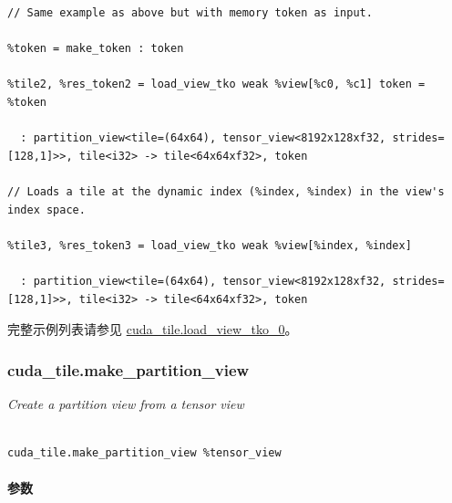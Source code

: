 \documentclass{article}
\begin{document}
\begin{itemize}
\begin{lstlisting}
// Same example as above but with memory token as input.

%token = make_token : token

%tile2, %res_token2 = load_view_tko weak %view[%c0, %c1] token = %token

  : partition_view<tile=(64x64), tensor_view<8192x128xf32, strides=[128,1]>>, tile<i32> -> tile<64x64xf32>, token

// Loads a tile at the dynamic index (%index, %index) in the view's index space.

%tile3, %res_token3 = load_view_tko weak %view[%index, %index]

  : partition_view<tile=(64x64), tensor_view<8192x128xf32, strides=[128,1]>>, tile<i32> -> tile<64x64xf32>, token

\end{lstlisting}



\end{itemize}
完整示例列表请参见 \href{https://docs.nvidia.com/cuda/tile-ir/latest/sections/appendix.html#example-cuda-tile-load-view-tko-0}{cuda\_tile.load\_view\_tko\_0}。





\subsubsection{cuda\_tile.make\_partition\_view}


\textit{Create a partition view from a tensor view}




\begin{lstlisting}

cuda_tile.make_partition_view %tensor_view

\end{lstlisting}



\paragraph{参数}
\end{document}
